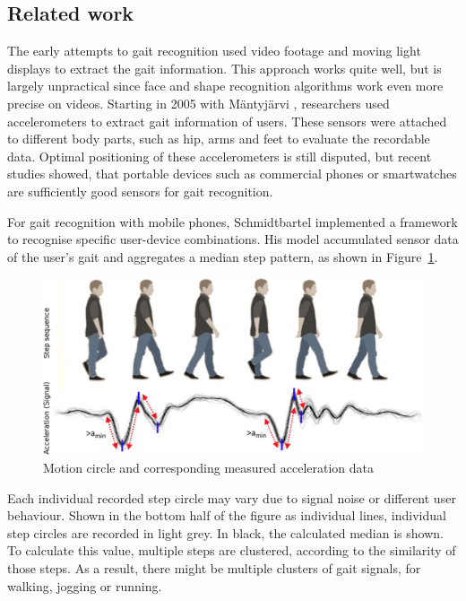 \subsection{Related work}
The early attempts to gait recognition used video footage and moving light displays to extract the gait information. This approach works quite well, but is largely unpractical since face and shape recognition algorithms work even more precise on videos. Starting in 2005 with Mäntyjärvi \etal\cite{mantyjarvi2005identifying}, researchers used accelerometers to extract gait information of users. These sensors were attached to different body parts, such as hip, arms and feet to evaluate the recordable data. Optimal positioning of these accelerometers is still disputed, but recent studies showed, that portable devices such as commercial phones\cite{derawi2013gait} or smartwatches\cite{johnstonsmartwatch} are sufficiently good sensors for gait recognition.

For gait recognition with mobile phones, Schmidtbartel\cite{thesisschmidbartl} implemented a framework to recognise specific user-device combinations. His model accumulated sensor data of the user's gait and aggregates a median step pattern, as shown in Figure~\ref{fig:gaitacceleration}. 
\begin{figure}
    \centering
    \includegraphics[width=\textwidth]{figures/GaitAcceleration.png}
    \caption{Motion circle and corresponding measured acceleration data\cite{thesisschmidbartl}}
    \label{fig:gaitacceleration}
\end{figure}

Each individual recorded step circle may vary due to signal noise or different user behaviour. Shown in the bottom half of the figure as individual lines, individual step circles are recorded in light grey. In black, the calculated median is shown. To calculate this value, multiple steps are clustered, according to the similarity of those steps. As a result, there might be multiple clusters of gait signals, \ie for walking, jogging or running.

